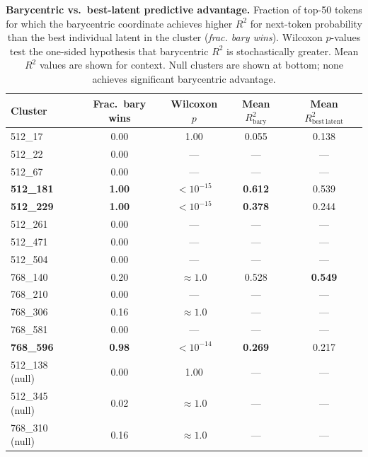 \documentclass{article}
\begin{document}
\begin{table}[t]
  \centering
  \caption{%
    \textbf{Barycentric vs.\ best-latent predictive advantage.}
    Fraction of top-50 tokens for which the barycentric coordinate achieves higher
    $R^2$ for next-token probability than the best individual latent in the cluster
    (\emph{frac. bary wins}).  Wilcoxon $p$-values test the one-sided hypothesis
    that barycentric $R^2$ is stochastically greater.  Mean $R^2$ values are shown
    for context.  Null clusters are shown at bottom; none achieves significant
    barycentric advantage.
  }
  \label{tab:bary}
  \begin{tabular}{lcccc}
    \toprule
    Cluster & Frac.\ bary wins & Wilcoxon $p$ & Mean $R^2_{\mathrm{bary}}$ & Mean $R^2_{\mathrm{best\,latent}}$ \\
    \midrule
    512\_17   & 0.00 & 1.00         & 0.055 & 0.138 \\
    512\_22   & 0.00 & ---          & ---   & --- \\
    512\_67   & 0.00 & ---          & ---   & --- \\
    \textbf{512\_181}  & \textbf{1.00} & $< 10^{-15}$ & \textbf{0.612} & 0.539 \\
    \textbf{512\_229}  & \textbf{1.00} & $< 10^{-15}$ & \textbf{0.378} & 0.244 \\
    512\_261  & 0.00 & ---          & ---   & --- \\
    512\_471  & 0.00 & ---          & ---   & --- \\
    512\_504  & 0.00 & ---          & ---   & --- \\
    768\_140  & 0.20 & $\approx 1.0$& 0.528 & \textbf{0.549} \\
    768\_210  & 0.00 & ---          & ---   & --- \\
    768\_306  & 0.16 & $\approx 1.0$& ---   & --- \\
    768\_581  & 0.00 & ---          & ---   & --- \\
    \textbf{768\_596}  & \textbf{0.98} & $< 10^{-14}$ & \textbf{0.269} & 0.217 \\
    \midrule
    512\_138 (null) & 0.00 & 1.00 & --- & --- \\
    512\_345 (null) & 0.02 & $\approx 1.0$ & --- & --- \\
    768\_310 (null) & 0.16 & $\approx 1.0$ & --- & --- \\
    \bottomrule
  \end{tabular}
\end{table}
\end{document}
